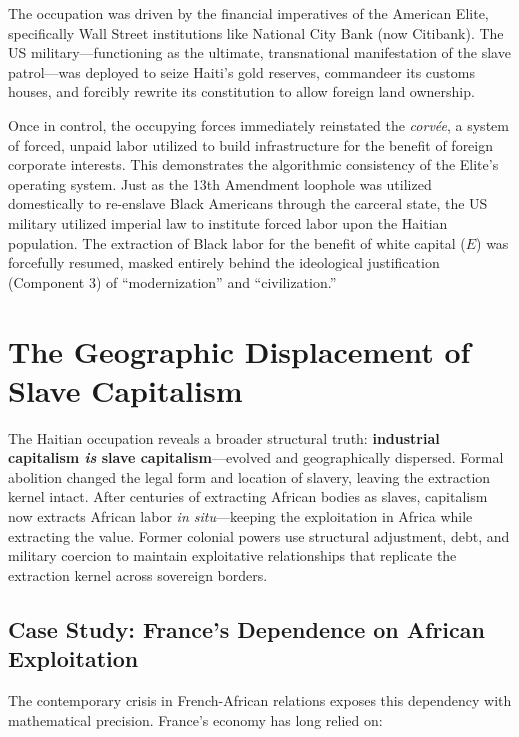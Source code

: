 The occupation was driven by the financial imperatives of the American Elite, specifically Wall Street institutions like National City Bank (now Citibank). The US military—functioning as the ultimate, transnational manifestation of the slave patrol—was deployed to seize Haiti's gold reserves, commandeer its customs houses, and forcibly rewrite its constitution to allow foreign land ownership.

Once in control, the occupying forces immediately reinstated the \textit{corv\'{e}e}, a system of forced, unpaid labor utilized to build infrastructure for the benefit of foreign corporate interests. This demonstrates the algorithmic consistency of the Elite's operating system. Just as the 13th Amendment loophole was utilized domestically to re-enslave Black Americans through the carceral state, the US military utilized imperial law to institute forced labor upon the Haitian population. The extraction of Black labor for the benefit of white capital ($E$) was forcefully resumed, masked entirely behind the ideological justification (Component 3) of ``modernization'' and ``civilization.''

\section{The Geographic Displacement of Slave Capitalism}

The Haitian occupation reveals a broader structural truth: \textbf{industrial capitalism \textit{is} slave capitalism}---evolved and geographically dispersed. Formal abolition changed the legal form and location of slavery, leaving the extraction kernel intact. After centuries of extracting African bodies as slaves, capitalism now extracts African labor \textit{in situ}---keeping the exploitation in Africa while extracting the value. Former colonial powers use structural adjustment, debt, and military coercion to maintain exploitative relationships that replicate the extraction kernel across sovereign borders.

\subsection{Case Study: France's Dependence on African Exploitation}

The contemporary crisis in French-African relations exposes this dependency with mathematical precision. France's economy has long relied on:

